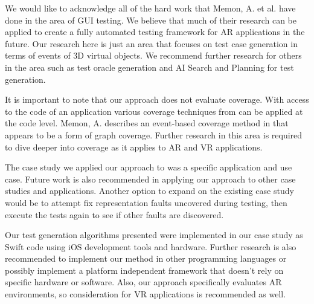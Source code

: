 \documentclass[final,3p]{CSP}
\begin{document}
We would like to acknowledge all of the hard work that Memon, A. et al. have done in the area of GUI testing. We believe that much of their research can be applied to create a fully automated testing framework for AR applications in the future.  Our research here is just an area that focuses on test case generation in terms of events of 3D virtual objects. We recommend further research for others in the area such as test oracle generation and AI Search and Planning for test generation.

It is important to note that our approach does not evaluate coverage.  With access to the code of an application various coverage techniques from \cite{intrototesting} can be applied at the code level.  Memon, A. describes an event-based coverage method in \cite{framework} that appears to be a form of graph coverage.  Further research in this area is required to dive deeper into coverage as it applies to AR and VR applications.

The case study we applied our approach to was a specific application and use case.  Future work is also recommended in applying our approach to other case studies and applications.  Another option to expand on the existing case study would be to attempt fix representation faults uncovered during testing, then execute the tests again to see if other faults are discovered.

Our test generation algorithms presented were implemented in our case study as Swift code using iOS development tools and hardware.  Further research is also recommended to implement our method in other programming languages or possibly implement a platform independent framework that doesn't rely on specific hardware or software.  Also, our approach specifically evaluates AR environments, so consideration for VR applications is recommended as well.

\it

\end{document}
